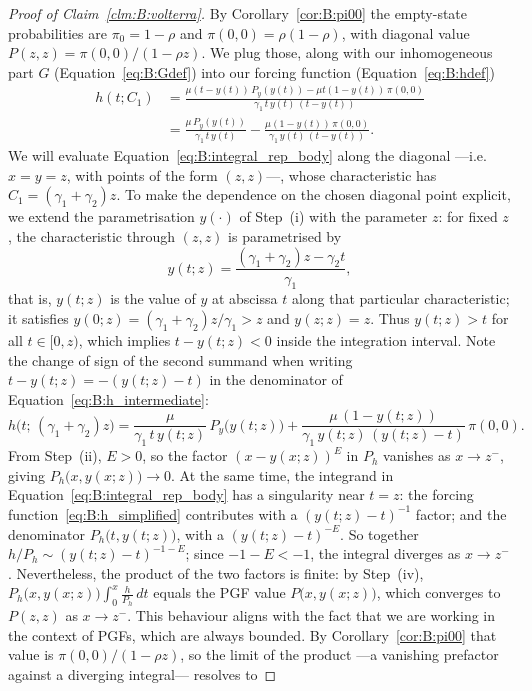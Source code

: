 \begin{proof}[Proof of Claim~\ref{clm:B:volterra}]
    By Corollary~\ref{cor:B:pi00} the empty-state probabilities are $\pi_0=1-\rho$ and $\pi(0,0)=\rho(1-\rho)$, with diagonal value $P(z,z)=\pi(0,0)/(1-\rho z)$. We plug those, along with our inhomogeneous part $G$ (Equation~\eqref{eq:B:Gdef}) into our forcing function (Equation~\eqref{eq:B:hdef})
    \begin{align}
        h(t;C_1)
        &= \frac{\mu(t-y(t))\,P_y(y(t)) - \mu t(1-y(t))\,\pi(0,0)}
                 {\gamma_1\,t\,y(t)\,(t-y(t))} \nonumber\\
        &= \frac{\mu\,P_y(y(t))}{\gamma_1\,t\,y(t)}
           - \frac{\mu(1-y(t))\,\pi(0,0)}{\gamma_1\,y(t)\,(t-y(t))}.
        \label{eq:B:h_intermediate}
    \end{align}
    We will evaluate Equation~\eqref{eq:B:integral_rep_body} along the diagonal ---i.e.\ $x=y=z$, with points of the form $(z,z)$---, whose characteristic has $C_1=(\gamma_1+\gamma_2)z$. To make the dependence on the chosen diagonal point explicit, we extend the parametrisation $y(\cdot)$ of Step~(i) with the parameter $z$: for fixed $z$, the characteristic through $(z,z)$ is parametrised by
    \begin{equation}
        y(t;z)=\frac{(\gamma_1+\gamma_2)z-\gamma_2 t}{\gamma_1},
        \label{eq:B:ydiag}
    \end{equation}
    that is, $y(t;z)$ is the value of $y$ at abscissa $t$ along that particular characteristic; it satisfies $y(0;z)=(\gamma_1+\gamma_2)z/\gamma_1>z$ and $y(z;z)=z$. Thus $y(t;z)>t$ for all $t\in[0,z)$, which implies $t-y(t;z)<0$ inside the integration interval. Note the change of sign of the second summand when writing $t-y(t;z)=-(y(t;z)-t)$ in the denominator of Equation~\eqref{eq:B:h_intermediate}:
    \begin{equation}
        h\bigl(t;\,(\gamma_1+\gamma_2)z\bigr)
        = \frac{\mu}{\gamma_1\,t\,y(t;z)}\,P_y\!\bigl(y(t;z)\bigr)
        + \frac{\mu\,(1-y(t;z))}{\gamma_1\,y(t;z)\,(y(t;z)-t)}\,\pi(0,0).
        \label{eq:B:h_simplified}
    \end{equation}
    From Step~(ii), $E>0$, so the factor $(x-y(x;z))^E$ in $P_h$ vanishes as $x\to z^-$, giving $P_h\bigl(x,y(x;z)\bigr)\to0$. At the same time, the integrand in Equation~\eqref{eq:B:integral_rep_body} has a singularity near $t=z$: the forcing function~\eqref{eq:B:h_simplified} contributes with a $(y(t;z)-t)^{-1}$ factor; and the denominator $P_h\bigl(t,y(t;z)\bigr)$, with a $(y(t;z)-t)^{-E}$. So together $h/P_h\sim(y(t;z)-t)^{-1-E}$; since $-1-E<-1$, the integral diverges as $x\to z^-$. Nevertheless, the product of the two factors is finite: by Step~(iv), $P_h\bigl(x,y(x;z)\bigr)\int_0^x\frac{h}{P_h}\,dt$ equals the PGF value $P\bigl(x,y(x;z)\bigr)$, which converges to $P(z,z)$ as $x\to z^-$. This behaviour aligns with the fact that we are working in the context of PGFs, which are always bounded. By Corollary~\ref{cor:B:pi00} that value is $\pi(0,0)/(1-\rho z)$, so the limit of the product ---a vanishing prefactor against a diverging integral--- resolves to

\end{proof}
